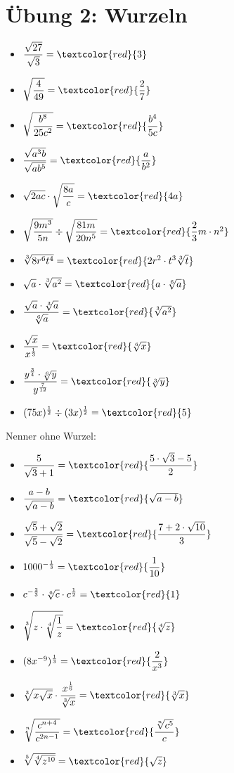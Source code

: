 \documentclass[11pt, a4paper, twoside, fleqn]{article}
\begin{document}
\section{Übung 2: Wurzeln}
\begin{itemize} [itemsep=3ex]
\item $ \dfrac{\sqrt{27}}{\sqrt{3}} = \textcolor{red}{3} $
\item $ \sqrt{\dfrac{4}{49}} = \textcolor{red}{\dfrac{2}{7}} $
\item $ \sqrt{\dfrac{b^{8}}{25c^{2}}} = \textcolor{red}{\dfrac{b^{4}}{5c}} $
\item $ \dfrac{\sqrt{a^{3}b}}{\sqrt{ab^{5}}} = \textcolor{red}{\dfrac{a}{b^{2}}} $
\item $ \sqrt{2ac} \cdot \sqrt{\dfrac{8a}{c}} = \textcolor{red}{4a} $
\item $ \sqrt{\dfrac{9m^{3}}{5n}} \div \sqrt{\dfrac{81m}{20n^{5}}} = \textcolor{red}{\dfrac{2}{3} m \cdot n^{2}} $
\item $ \sqrt[3]{8r^{6}t^{4}} = \textcolor{red}{2r^{2} \cdot t^{3} \sqrt[3]{t}} $
\item $\sqrt{a} \cdot \sqrt[3]{a^{2}} = \textcolor{red}{ a \cdot \sqrt[6]{a}}$
\item $ \dfrac{\sqrt{a} \cdot \sqrt[3]{a}}{\sqrt[6]{a}} = \textcolor{red}{\sqrt[3]{a^{2}}} $
\item $ \dfrac{\sqrt{x}}{x^{\frac{1}{3}}} = \textcolor{red}{\sqrt[6]{x}} $
\item $ \dfrac{y^{\frac{3}{4}} \cdot \sqrt[6]{y}}{y^{\frac{7}{12}}} = \textcolor{red}{\sqrt[3]{y}} $
\item $ (75x)^{\frac{1}{2}} \div (3x)^{\frac{1}{2}} = \textcolor{red}{5} $
\end{itemize}
\noindent Nenner ohne Wurzel:
\begin{itemize} [itemsep=3ex]
\item $ \dfrac{5}{\sqrt{3} + 1} = \textcolor{red}{\dfrac{5 \cdot \sqrt{3} - 5}{2}} $
\item $ \dfrac{a - b}{\sqrt{a - b}} = \textcolor{red}{\sqrt{a - b}} $
\item $ \dfrac{\sqrt{5} + \sqrt{2}}{\sqrt{5} - \sqrt{2}} = \textcolor{red}{\dfrac{7 +2 \cdot \sqrt{10}}{3}} $
\item $ 1000^{- \frac{1}{3}} = \textcolor{red}{\dfrac{1}{10}} $
\item $ c^{- \frac{2}{3}} \cdot \sqrt[6]{c} \cdot c^{\frac{1}{2}} = \textcolor{red}{1} $
\item $ \sqrt[3]{z \cdot \sqrt[4]{\dfrac{1}{z}}} = \textcolor{red}{\sqrt[4]{z}} $
\item $ (8x^{-9})^{\frac{1}{3}} = \textcolor{red}{\dfrac{2}{x^{3}}} $
\item $ \sqrt[3]{x\sqrt{x}} \cdot \dfrac{x^{\frac{1}{6}}}{\sqrt[3]{x}} = \textcolor{red}{\sqrt[3]{x}} $
\item $ \sqrt[n]{\dfrac{c^{n+4}}{c^{2n-1}}} = \textcolor{red}{\dfrac{\sqrt[n]{c^5}}{c}} $
\item $ \sqrt[5]{\sqrt[4]{z^{10}}}= \textcolor{red}{\sqrt{z}} $
\end{itemize}
\end{document}
